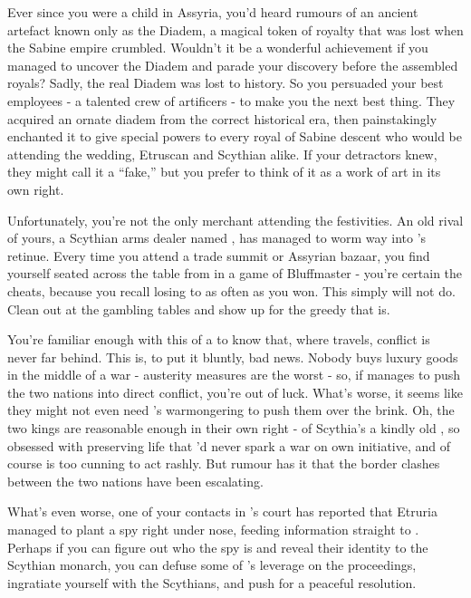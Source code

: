 \documentclass[char]{Kos}
\begin{document}
Ever since you were a child in Assyria, you'd heard rumours of an ancient artefact known only as the Diadem, a magical token of royalty that was lost when the Sabine empire crumbled. Wouldn't it be a wonderful achievement if you managed to uncover the Diadem and parade your discovery before the assembled royals? Sadly, the real Diadem was lost to history. So you persuaded your best employees - a talented crew of artificers - to make you the next best thing. They acquired an ornate diadem from the correct historical era, then painstakingly enchanted it to give special powers to every royal of Sabine descent who would be attending the wedding, Etruscan and Scythian alike. If your detractors knew, they might call it a ``fake,'' but you prefer to think of it as a work of art in its own right.

Unfortunately, you're not the only merchant attending the festivities. An old rival of yours, a Scythian arms dealer named \cArmsDealer{}, has managed to worm \cArmsDealer{\their} way into \cScythiaKing{\Monarch} \cScythiaKing{}'s retinue. Every time you attend a trade summit or Assyrian bazaar, you find yourself seated across the table from \cArmsDealer{\them} in a game of Bluffmaster - you're certain the \cArmsDealer{\human} cheats, because you recall losing to \cArmsDealer{\them} as often as you won. This simply will not do. Clean \cArmsDealer{} out at the gambling tables and show \cArmsDealer{\them} up for the greedy \cArmsDealer{\InsultOne} that \cArmsDealer{\they} is. 

You're familiar enough with this \cArmsDealer{\InsultTwo} of a \cArmsDealer{\human} to know that, where \cArmsDealer{\they} travels, conflict is never far behind. This is, to put it bluntly, bad news. Nobody buys luxury goods in the middle of a war - austerity measures are the worst - so, if \cArmsDealer{} manages to push the two nations into direct conflict, you're out of luck. What's worse, it seems like they might not even need \cArmsDealer{}'s warmongering to push them over the brink. Oh, the two kings are reasonable enough in their own right - \cScythiaKing{} of Scythia's a kindly old \cScythiaKing{\human}, so obsessed with preserving life that \cScythiaKing{\they}'d never spark a war on \cScythiaKing{\their} own initiative, and \cEtruriaKing{} of course is too cunning to act rashly. But rumour has it that the border clashes between the two nations have been escalating. 

What's even worse, one of your contacts in \cScythiaKing{\Monarch} \cScythiaKing{}'s court has reported that Etruria managed to plant a spy right under \cScythiaKing{\their} nose, feeding information straight to \cEtruriaKing{}. Perhaps if you can figure out who the spy is and reveal their identity to the Scythian monarch, you can defuse some of \cEtruriaKing{}'s leverage on the proceedings, ingratiate yourself with the Scythians, and push for a peaceful resolution.
\end{document}

